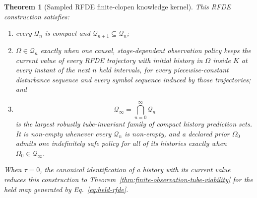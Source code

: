 \documentclass[11pt]{article}
\newtheorem{theorem}{Theorem}
\theoremstyle{definition}
\begin{document}
\begin{theorem}[Sampled RFDE finite-clopen knowledge kernel]
\label{thm:rfde-observation-viability}
This RFDE construction satisfies:
\begin{enumerate}
\item every $\mathcal Q_n$ is compact and
$\mathcal Q_{n+1}\subseteq\mathcal Q_n$;
\item $\Omega\in\mathcal Q_n$ exactly when one causal, stage-dependent
observation policy keeps the current value of every RFDE trajectory with
initial history in $\Omega$ inside $K$ at every instant of the next $n$
held intervals, for every piecewise-constant disturbance sequence and every
symbol sequence induced by those trajectories; and
\item
\begin{equation}
\mathcal Q_\infty=\bigcap_{n=0}^{\infty}\mathcal Q_n
\label{eq:rfde-observation-kernel}
\end{equation}
is the largest robustly tube-invariant family of compact history prediction
sets.  It is non-empty whenever every $\mathcal Q_n$ is non-empty, and a
declared prior $\Omega_0$ admits one indefinitely safe policy for all of its
histories exactly when $\Omega_0\in\mathcal Q_\infty$.
\end{enumerate}
When $\tau=0$, the canonical identification of a history with its current
value reduces this construction to
Theorem~\ref{thm:finite-observation-tube-viability} for the held map generated
by Eq.~\eqref{eq:held-rfde}.
\end{theorem}
\end{document}
